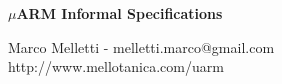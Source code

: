 \documentclass[a4paper,12pt]{report}
\begin{document}
\begin{titlepage}
\begin{center}
	\huge\textbf{$\mu$ARM Informal Specifications}
\end{center}
\vfill
\Large{Marco Melletti - melletti.marco@gmail.com\\http://www.mellotanica.com/uarm}
\end{titlepage}

\tableofcontents


\end{document}
